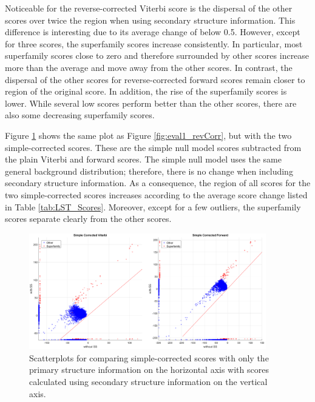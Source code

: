 Noticeable for the reverse-corrected Viterbi score is the dispersal of the other scores over twice the region when using secondary structure information. This difference is interesting due to its average change of below 0.5. However, except for three scores, the superfamily scores increase consistently. In particular, most superfamily scores close to zero and therefore surrounded by other scores increase more than the average and move away from the other scores. In contrast, the dispersal of the other scores for reverse-corrected forward scores remain closer to region of the original score. In addition, the rise of the superfamily scores is lower. While several low scores perform better than the other scores, there are also some decreasing superfamily scores.





Figure \ref{fig:eval1_simp} shows the same plot as Figure \ref{fig:eval1_revCorr}, but with the two simple-corrected scores. These are the simple null model scores subtracted from the plain Viterbi and forward scores. The simple null model uses the same general background distribution; therefore, there is no change when including secondary structure information. As a consequence, the region of all scores for the two simple-corrected scores increases according to the average score change listed in Table  \ref{tab:LST_Scores}. Moreover, except for a few outliers, the superfamily scores separate clearly from the other scores.


\begin{figure}[H]
	\begin{center}
		\includegraphics[width=0.92\textwidth]{fig/1simpleCorr}
	\end{center}
	\caption[Scatterplots for comparing simple-corrected scores with and without secondary structure information.]{Scatterplots for comparing simple-corrected scores with only the primary structure information on the horizontal axis with scores calculated using secondary structure information on the vertical axis. }
	\label{fig:eval1_simp}
\end{figure}
